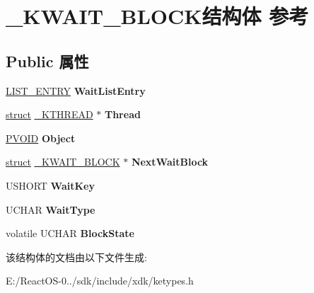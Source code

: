 \hypertarget{struct___k_w_a_i_t___b_l_o_c_k}{}\section{\+\_\+\+K\+W\+A\+I\+T\+\_\+\+B\+L\+O\+C\+K结构体 参考}
\label{struct___k_w_a_i_t___b_l_o_c_k}
\subsection*{Public 属性}
\begin{DoxyCompactItemize}
\item 
\mbox{\label{struct___k_w_a_i_t___b_l_o_c_k_a5f167cfc12ed836db7b0600dddbba540}} 
\hyperlink{struct___l_i_s_t___e_n_t_r_y}{L\+I\+S\+T\+\_\+\+E\+N\+T\+RY} {\bfseries Wait\+List\+Entry}
\item 
\mbox{\label{struct___k_w_a_i_t___b_l_o_c_k_a4ae6ac31777dc087b694afb75b0b9f13}} 
\hyperlink{interfacestruct}{struct} \hyperlink{struct___k_t_h_r_e_a_d}{\+\_\+\+K\+T\+H\+R\+E\+AD} $\ast$ {\bfseries Thread}
\item 
\mbox{\label{struct___k_w_a_i_t___b_l_o_c_k_a57b827325f746f7606dd063e1dcc8d35}} 
\hyperlink{interfacevoid}{P\+V\+O\+ID} {\bfseries Object}
\item 
\mbox{\label{struct___k_w_a_i_t___b_l_o_c_k_a9adae517a3c8492b321049ff1616d111}} 
\hyperlink{interfacestruct}{struct} \hyperlink{struct___k_w_a_i_t___b_l_o_c_k}{\+\_\+\+K\+W\+A\+I\+T\+\_\+\+B\+L\+O\+CK} $\ast$ {\bfseries Next\+Wait\+Block}
\item 
\mbox{\label{struct___k_w_a_i_t___b_l_o_c_k_ae9acde2cdb6ce61f8576f8256cef10d0}} 
U\+S\+H\+O\+RT {\bfseries Wait\+Key}
\item 
\mbox{\label{struct___k_w_a_i_t___b_l_o_c_k_a635b52d772d8cd5f88b56b876fddd58c}} 
U\+C\+H\+AR {\bfseries Wait\+Type}
\item 
\mbox{\label{struct___k_w_a_i_t___b_l_o_c_k_a21bd4ad74a006c747de29c6926e5be5a}} 
volatile U\+C\+H\+AR {\bfseries Block\+State}
\end{DoxyCompactItemize}


该结构体的文档由以下文件生成\+:\begin{DoxyCompactItemize}
\item 
E\+:/\+React\+O\+S-\/0../sdk/include/xdk/ketypes.\+h\end{DoxyCompactItemize}
